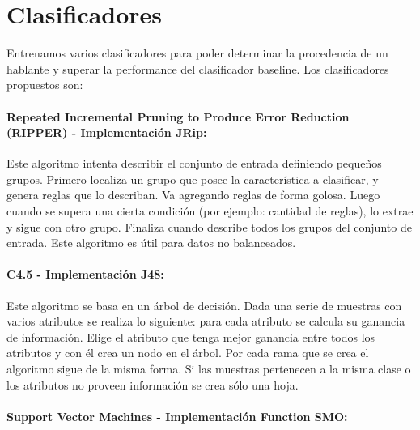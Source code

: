 \section{Clasificadores}

Entrenamos varios clasificadores para poder determinar la procedencia de un hablante y superar la performance del clasificador baseline. Los clasificadores propuestos son: 

\paragraph{Repeated Incremental Pruning to Produce Error Reduction (RIPPER) \cite{Cohen1995} - Implementación JRip:}


Este algoritmo intenta describir el conjunto de entrada definiendo pequeños grupos. Primero localiza un grupo que posee la característica a clasificar, y genera reglas que lo describan. Va agregando reglas de forma golosa. Luego cuando se supera una cierta condición (por ejemplo: cantidad de reglas), lo extrae y sigue con otro grupo. Finaliza cuando describe todos los grupos del conjunto de entrada. Este algoritmo es útil para datos no balanceados.

\paragraph{C4.5 \cite{Quinlan1993} - Implementación J48:}


Este algoritmo se basa en un árbol de decisión. Dada una serie de muestras con varios atributos se realiza lo siguiente: para cada atributo se calcula su ganancia de información. Elige el atributo que tenga mejor ganancia entre todos los atributos y con él crea un nodo en el árbol. Por cada rama que se crea el algoritmo sigue de la misma forma. Si las muestras pertenecen a la misma clase o los atributos no proveen información se crea sólo una hoja.

\paragraph{Support Vector Machines \cite{Platt98sequentialminimal} - Implementación Function SMO:}

